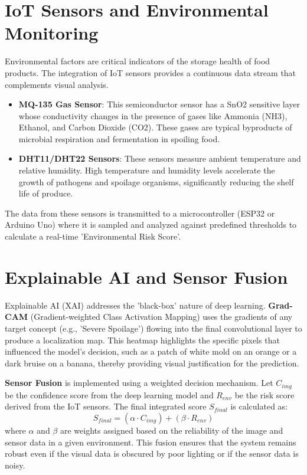 \section[IoT Sensors and Environmental Monitoring]{\textbf{IoT Sensors and Environmental Monitoring}}
Environmental factors are critical indicators of the storage health of food products. The integration of IoT sensors provides a continuous data stream that complements visual analysis.
\begin{itemize}
    \item \textbf{MQ-135 Gas Sensor}: This semiconductor sensor has a SnO2 sensitive layer whose conductivity changes in the presence of gases like Ammonia (NH3), Ethanol, and Carbon Dioxide (CO2). These gases are typical byproducts of microbial respiration and fermentation in spoiling food.
    \item \textbf{DHT11/DHT22 Sensors}: These sensors measure ambient temperature and relative humidity. High temperature and humidity levels accelerate the growth of pathogens and spoilage organisms, significantly reducing the shelf life of produce.
\end{itemize}
The data from these sensors is transmitted to a microcontroller (ESP32 or Arduino Uno) where it is sampled and analyzed against predefined thresholds to calculate a real-time 'Environmental Risk Score'.

\section[Explainable AI and Sensor Fusion]{\textbf{Explainable AI and Sensor Fusion}}
Explainable AI (XAI) addresses the 'black-box' nature of deep learning. \textbf{Grad-CAM} (Gradient-weighted Class Activation Mapping) uses the gradients of any target concept (e.g., 'Severe Spoilage') flowing into the final convolutional layer to produce a localization map. This heatmap highlights the specific pixels that influenced the model's decision, such as a patch of white mold on an orange or a dark bruise on a banana, thereby providing visual justification for the prediction.

\textbf{Sensor Fusion} is implemented using a weighted decision mechanism. Let $C_{img}$ be the confidence score from the deep learning model and $R_{env}$ be the risk score derived from the IoT sensors. The final integrated score $S_{final}$ is calculated as:
\begin{equation}
    S_{final} = (\alpha \cdot C_{img}) + (\beta \cdot R_{env})
\end{equation}
where $\alpha$ and $\beta$ are weights assigned based on the reliability of the image and sensor data in a given environment. This fusion ensures that the system remains robust even if the visual data is obscured by poor lighting or if the sensor data is noisy.
